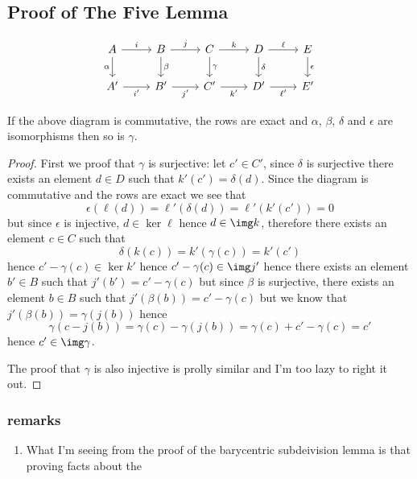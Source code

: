 \documentclass{pset}
\begin{document}
\subsection{Proof of The Five Lemma}
\[\begin{tikzcd}
	A & B & C & D & E \\
	{A'} & {B'} & {C'} & {D'} & {E'}
	\arrow["i", from=1-1, to=1-2]
	\arrow["j", from=1-2, to=1-3]
	\arrow["k", from=1-3, to=1-4]
	\arrow["\ell", from=1-4, to=1-5]
	\arrow["\epsilon", from=1-5, to=2-5]
	\arrow["\delta", from=1-4, to=2-4]
	\arrow["\gamma", from=1-3, to=2-3]
	\arrow["\beta", from=1-2, to=2-2]
	\arrow["\alpha"', from=1-1, to=2-1]
	\arrow["{i'}"', from=2-1, to=2-2]
	\arrow["{j'}"', from=2-2, to=2-3]
	\arrow["{k'}"', from=2-3, to=2-4]
	\arrow["\ell'"', from=2-4, to=2-5]
\end{tikzcd}\]
\begin{theorem}
    If the above diagram is commutative, the rows are exact and $\alpha$, $\beta$, $\delta$ and $\epsilon$ are isomorphisms then so is $\gamma$.
\end{theorem}
\begin{proof}
    First we proof that $\gamma$ is surjective: let $c'\in C'$, since $\delta$ is surjective there exists an element $d\in D$ such that $k'(c') = \delta(d)$. Since the diagram is commutative and the rows are exact we see that
    \[\epsilon(\ell(d)) = \ell'(\delta(d)) = \ell'(k'(c')) = 0\]
    but since $\epsilon$ is injective, $d\in\ker\ell$ hence $d\in\img k$, therefore there exists an element $c\in C$ such that
    \[\delta(k(c)) = k'(\gamma(c)) = k'(c')\]
    hence $c'-\gamma(c)\in\ker k'$ hence $c'-\gamma(c)\in\img j'$ hence there exists an element $b'\in B$ such that $j'(b') = c'-\gamma(c)$ but since $\beta$ is surjective, there exists an element $b\in B$ such that $j'(\beta(b)) = c'-\gamma(c)$ but we know that $j'(\beta(b)) = \gamma(j(b))$ hence
    \[\gamma(c-j(b)) = \gamma(c) - \gamma(j(b)) = \gamma(c)+c'-\gamma(c) = c'\]
    hence $c'\in\img \gamma$.

    The proof that $\gamma$ is also injective is prolly similar and I'm too lazy to right it out.
\end{proof}
\subsubsection{remarks}
\begin{enumerate}[label=\arabic*.]
    \item What I'm seeing from the proof of the barycentric subdeivision lemma is that proving facts about the 
\end{enumerate}
\end{document}
